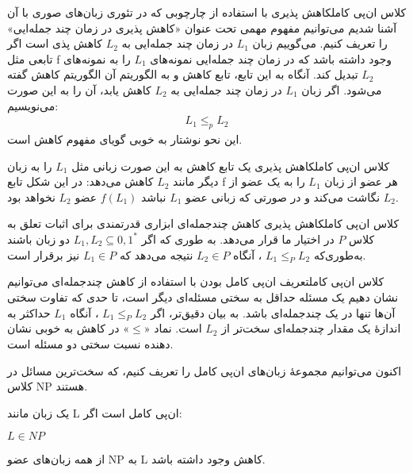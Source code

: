 \begin{itemframe-s}{کلاس ان‌پی کامل}{کاهش پذیری}
\itm
با استفاده از چارچوبی که در تئوری زبان‌های صوری با آن آشنا شدیم می‌توانیم مفهوم مهمی تحت عنوان «کاهش پذیری در زمان چند جمله‌ایی»
را تعریف کنیم.
\itm
می‌گوییم زبان $ L_1 $ در زمان چند جمله‌ایی به $ L_2 $  کاهش پذی است  اگر تابعی مثل f وجود داشته باشد که در زمان چند جمله‌ایی نمونه‌های $ L_1 $ را به نمونه‌های $ L_2 $ تبدیل کند. آنگاه به این تابع، تابع کاهش
و به الگوریتم آن الگوریتم کاهش
گفته می‌شود.
\itm
اگر زبان $ L_1 $ در زمان چند جمله‌ایی به $ L_2 $ کاهش یابد، آن را به این صورت می‌نویسیم:
\begin{align*}
L_1 \leq_p L_2
\end{align*}
 این نحو نوشتار به خوبی گویای مفهوم کاهش است.
\end{itemframe-s}


\begin{itemframe-s}{کلاس ان‌پی کامل}{کاهش پذیری}
\itm
یک تابع کاهش به این صورت زبانی مثل
$L_1$
را به زبان دیگر مانند
$L_2$
کاهش می‌دهد:
 \itm
در این شکل تابع f هر عضو از زبان  $ L_1 $ را به یک عضو از $ L_2 $ نگاشت می‌کند و در صورتی که زبانی عضو  $ L_1 $  نباشد $ f(L_1)$ عضو $ L_2 $ نخواهد بود.
\end{itemframe-s}


\begin{itemframe-s}{کلاس ان‌پی کامل}{کاهش پذیری}
\itm
کاهش چندجمله‌ای ابزاری قدرتمندی برای اثبات تعلق به کلاس $P$ در اختیار ما قرار می‌دهد.
\itm
به طوری که اگر
$L_1, L_2 \subseteq {0,1}^*$
دو زبان باشند به‌طوری‌که
$L_1 \leq_P L_2$
، آنگاه
$L_2 \in P$
 نتیجه می‌دهد که
$L_1 \in P$
نیز برقرار است.
\end{itemframe-s}


\begin{itemframe-s}{کلاس ان‌پی کامل}{تعریف ان‌پی کامل بودن}
\itm
با استفاده از کاهش چندجمله‌ای می‌توانیم نشان دهیم یک مسئله حداقل به سختی مسئله‌ای دیگر است، تا حدی که تفاوت سختی آن‌ها تنها در یک چندجمله‌ای باشد.
\itm
 به بیان دقیق‌تر، اگر
 $L_1 \leq_P L_2$
، آنگاه
$L_1$
 حداکثر به اندازهٔ یک مقدار چندجمله‌ای سخت‌تر از
$L_2$
 است. نماد «$\leq$» در کاهش به خوبی نشان دهنده نسبت سختی دو مسئله است.

\itm
اکنون می‌توانیم مجموعهٔ زبان‌های ان‌پی کامل را تعریف کنیم، که سخت‌ترین مسائل در کلاس NP هستند.

یک زبان مانند L ان‌پی کامل است اگر:
\item[1]
$L \in NP$
\item[2]
از همه زبان‌های عضو NP  به L کاهش وجود داشته باشد.
\end{itemframe-s}



